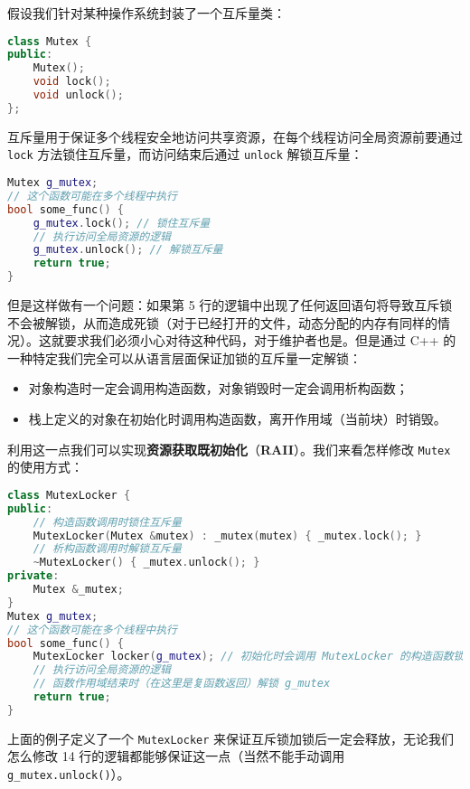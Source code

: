 \documentclass[hyperref,UTF8]{article}
\begin{document}
假设我们针对某种操作系统封装了一个互斥量类：
\begin{lstlisting}[language=c++]
class Mutex {
public:
    Mutex();
    void lock();
    void unlock();
};
\end{lstlisting}
互斥量用于保证多个线程安全地访问共享资源，在每个线程访问全局资源前要通过 \texttt{lock} 方法锁住互斥量，而访问结束后通过 \texttt{unlock} 解锁互斥量：
\begin{lstlisting}[language=c++]
Mutex g_mutex;
// 这个函数可能在多个线程中执行
bool some_func() {
    g_mutex.lock(); // 锁住互斥量
    // 执行访问全局资源的逻辑
    g_mutex.unlock(); // 解锁互斥量
    return true;
}
\end{lstlisting}
但是这样做有一个问题：如果第 5 行的逻辑中出现了任何返回语句将导致互斥锁不会被解锁，从而造成死锁（对于已经打开的文件，动态分配的内存有同样的情况）。这就要求我们必须小心对待这种代码，对于维护者也是。但是通过 C++ 的一种特定我们完全可以从语言层面保证加锁的互斥量一定解锁：
\begin{itemize}
  \item 对象构造时一定会调用构造函数，对象销毁时一定会调用析构函数；
  \item 栈上定义的对象在初始化时调用构造函数，离开作用域（当前块）时销毁。
\end{itemize}
利用这一点我们可以实现\textbf{资源获取既初始化}（\textbf{RAII}）。我们来看怎样修改 \texttt{Mutex} 的使用方式：
\begin{lstlisting}[language=c++]
class MutexLocker {
public:
    // 构造函数调用时锁住互斥量
    MutexLocker(Mutex &mutex) : _mutex(mutex) { _mutex.lock(); }
    // 析构函数调用时解锁互斥量
    ~MutexLocker() { _mutex.unlock(); }
private:
    Mutex &_mutex;
}
Mutex g_mutex;
// 这个函数可能在多个线程中执行
bool some_func() {
    MutexLocker locker(g_mutex); // 初始化时会调用 MutexLocker 的构造函数锁住 g_mutex
    // 执行访问全局资源的逻辑
    // 函数作用域结束时（在这里是复函数返回）解锁 g_mutex
    return true;
}
\end{lstlisting}
上面的例子定义了一个 \texttt{MutexLocker} 来保证互斥锁加锁后一定会释放，无论我们怎么修改 14 行的逻辑都能够保证这一点（当然不能手动调用 \texttt{g\_mutex.unlock()}）。


\end{document}
